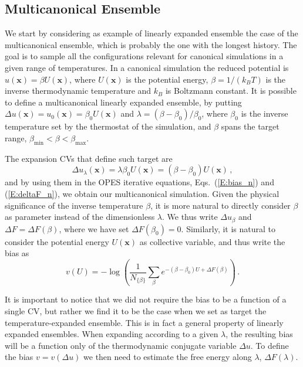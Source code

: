 \documentclass[aps,prx,reprint,superscriptaddress]{revtex4-1} %
\begin{document}
\subsection{Multicanonical Ensemble\label{S:multicanonical}}
We start by considering as example of linearly expanded ensemble the case of the multicanonical ensemble, which is probably the one with the longest history.
The goal is to sample all the configurations relevant for canonical simulations in a given range of temperatures.
In a canonical simulation the reduced potential is $u(\mathbf{x})=\beta U(\mathbf{x})$, where $U(\mathbf{x})$ is the potential energy, $\beta=1/(k_B T)$ is the inverse thermodynamic temperature and $k_B$ is Boltzmann constant.
It is possible to define a multicanonical linearly expanded ensemble, by putting $\Delta u(\mathbf{x})=u_0(\mathbf{x})=\beta_0U(\mathbf{x})$ and $\lambda=(\beta-\beta_0)/\beta_0$, where $\beta_0$ is the inverse temperature set by the thermostat of the simulation, and $\beta$ spans the target range, $\beta_{\min}<\beta<\beta_{\max}$.

The expansion CVs that define such target are 
\begin{equation}
    \Delta u_\lambda(\mathbf{x})=\lambda \beta_0U(\mathbf{x})=(\beta-\beta_0)U(\mathbf{x})\, ,
\end{equation}
and by using them in the OPES iterative equations, Eqs.~(\ref{E:bias_n}) and (\ref{E:deltaF_n}), we obtain our multicanonical simulation.
Given the physical significance of the inverse temperature $\beta$, it is more natural to directly consider $\beta$ as parameter instead of the dimensionless $\lambda$.
We thus write $\Delta u_\beta$ and $\Delta F=\Delta F(\beta)$, where we have set $\Delta F(\beta_0)=0$.
Similarly, it is natural to consider the potential energy $U(\mathbf{x})$ as collective variable, and thus write the bias as
\begin{equation}
    v(U)=-\log \left( \frac{1}{N_{\{\beta\}}}\sum_\beta e^{-(\beta-\beta_0)U + \Delta F(\beta)}\right)\, .
\end{equation}

It is important to notice that we did not require the bias to be a function of a single CV, but rather we find it to be the case when we set as target the temperature-expanded ensemble.
This is in fact a general property of linearly expanded ensembles.
When expanding according to a given $\lambda$, the resulting bias will be a function only of the thermodynamic conjugate variable $\Delta u$.
To define the bias $v=v(\Delta u)$ we then need to estimate the free energy along $\lambda$, $\Delta F(\lambda)$.
\end{document}
